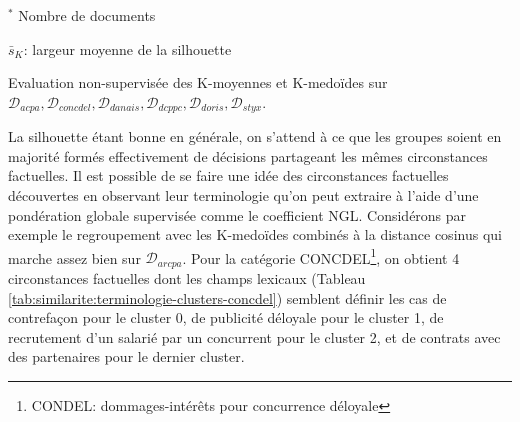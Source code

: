 \begin{table}[!htb]
	$^*$ Nombre de documents
	
$\bar{s}_K$: largeur moyenne de la silhouette

	\caption{Evaluation non-supervisée des K-moyennes et K-medoïdes sur $\mathcal{D}_{acpa}, \mathcal{D}_{concdel}, \mathcal{D}_{danais}, \mathcal{D}_{dcppc}, \mathcal{D}_{doris}, \mathcal{D}_{styx}$.} \label{tab:similarite:validation-nonsupervisee}
\end{table}

La silhouette étant bonne en générale, on s'attend à ce que les groupes soient en majorité formés effectivement de décisions partageant les mêmes circonstances factuelles. Il est possible de se faire une idée des circonstances factuelles découvertes en observant leur terminologie qu'on peut extraire à l'aide d'une pondération globale supervisée comme le coefficient NGL. Considérons par exemple le regroupement avec les K-medoïdes combinés à la distance cosinus qui marche assez bien sur $\mathcal{D}_{arcpa}$. Pour la catégorie CONCDEL\footnote{CONDEL: dommages-intérêts pour concurrence déloyale}, on obtient 4 circonstances factuelles dont les champs lexicaux (Tableau \ref{tab:similarite:terminologie-clusters-concdel}) semblent définir les cas de contrefaçon pour le cluster 0, de publicité déloyale pour le cluster 1, de recrutement d'un salarié par un concurrent pour le cluster 2, et de contrats avec des partenaires pour le dernier cluster.



